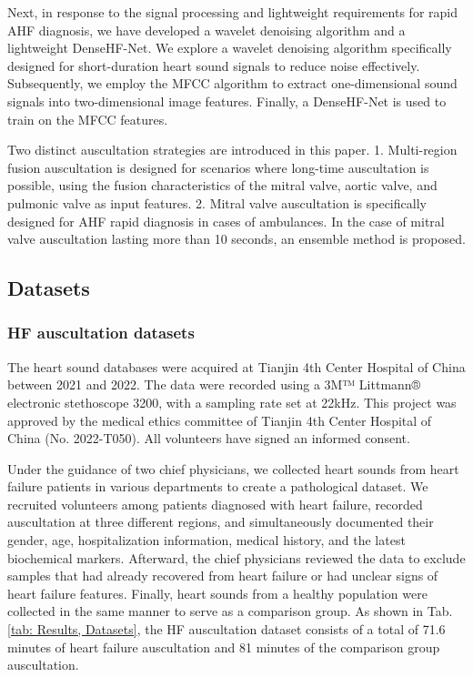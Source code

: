 Next, in response to the signal processing and lightweight requirements for rapid AHF diagnosis, we have developed a wavelet denoising algorithm and a lightweight DenseHF-Net. We explore a wavelet denoising algorithm specifically designed for short-duration heart sound signals to reduce noise effectively. Subsequently, we employ the MFCC algorithm to extract one-dimensional sound signals into two-dimensional image features. Finally, a DenseHF-Net is used to train on the MFCC features.

Two distinct auscultation strategies are introduced in this paper.  1. Multi-region fusion auscultation is designed for
scenarios where long-time auscultation is possible, using the fusion characteristics of the mitral valve, aortic valve, and pulmonic valve as input features. 2. Mitral valve auscultation is specifically
designed for AHF rapid diagnosis in cases of ambulances. In the case of mitral valve auscultation lasting more than 10 seconds, an ensemble method is proposed. 
\subsection{Datasets}
\subsubsection{HF auscultation datasets}
The heart sound databases were acquired at Tianjin 4th Center Hospital of China between 2021 and 2022. The data were recorded using a 3M™ Littmann® electronic stethoscope 3200, with a sampling rate set at 22kHz. This project was approved by the medical ethics committee of Tianjin 4th Center Hospital of China (No. 2022-T050). All volunteers have signed an informed consent. 

Under the guidance of two chief physicians, we collected heart sounds from heart failure patients in various departments to create a pathological dataset. We recruited volunteers among patients diagnosed with heart failure, recorded auscultation at three different regions, and simultaneously documented their gender, age, hospitalization information, medical history, and the latest biochemical markers. Afterward, the chief physicians reviewed the data to exclude samples that had already recovered from heart failure or had unclear signs of heart failure features. Finally, heart sounds from a healthy population were collected in the same manner to serve as a comparison group. As shown in Tab. \ref{tab: Results, Datasets}, the HF auscultation dataset consists of a total of 71.6 minutes of heart failure auscultation and 81 minutes of the comparison group auscultation.

